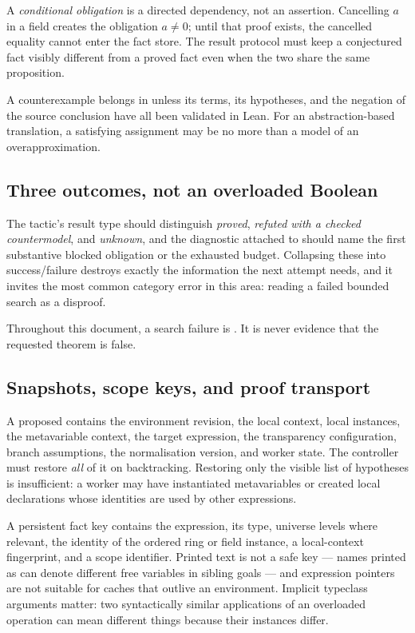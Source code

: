 A \emph{conditional obligation} is a directed dependency, not an assertion.
Cancelling $a$ in a field creates the obligation $a\ne0$; until that proof
exists, the cancelled equality cannot enter the fact store. The result protocol
must keep a conjectured fact visibly different from a proved fact even when the
two share the same proposition.

A counterexample belongs in  unless its terms, its hypotheses,
and the negation of the source conclusion have all been validated in Lean. For
an abstraction-based translation, a satisfying assignment may be no more than a
model of an overapproximation.

\subsection{Three outcomes, not an overloaded Boolean}

The tactic's result type should distinguish \emph{proved}, \emph{refuted with
a checked countermodel}, and \emph{unknown}, and the diagnostic attached to
\unknown{} should name the first substantive blocked obligation or the
exhausted budget. Collapsing these into success/failure destroys exactly the
information the next attempt needs, and it invites the most common category
error in this area: reading a failed bounded search as a disproof.

\begin{remark}
Throughout this document, a search failure is \unknown{}. It is never evidence
that the requested theorem is false.
\end{remark}

\subsection{Snapshots, scope keys, and proof transport}

A proposed  contains the environment revision, the local
context, local instances, the metavariable context, the target expression, the
transparency configuration, branch assumptions, the normalisation version, and
worker state. The controller must restore \emph{all} of it on backtracking.
Restoring only the visible list of hypotheses is insufficient: a worker may
have instantiated metavariables or created local declarations whose identities
are used by other expressions.

A persistent fact key contains the expression, its type, universe levels where
relevant, the identity of the ordered ring or field instance, a local-context
fingerprint, and a scope identifier. Printed text is not a safe key --- names
printed as  can denote different free variables in sibling goals ---
and expression pointers are not suitable for caches that outlive an
environment. Implicit typeclass arguments matter: two syntactically similar
applications of an overloaded operation can mean different things because their
instances differ.


